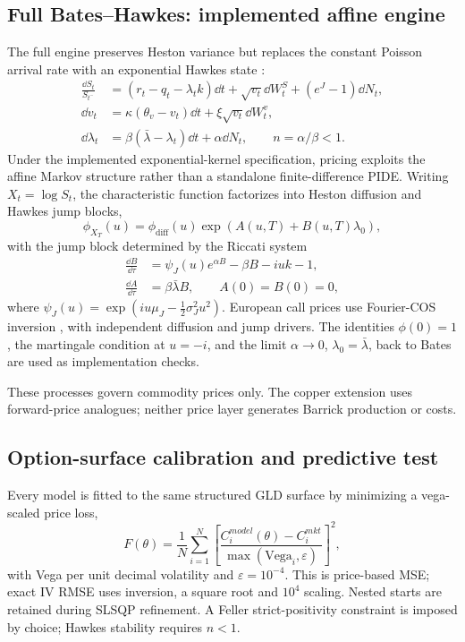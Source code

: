 \subsection{Full Bates--Hawkes: implemented affine engine}
The full engine preserves Heston variance but replaces the constant Poisson arrival rate with an exponential Hawkes state \citep{hawkes1971}:
\begin{align}
\frac{\dd S_t}{S_{t^-}}&=(r_t-q_t-\lambda_t k)\dd t+\sqrt{v_t}\dd W_t^S+(e^J-1)\dd N_t,\\
\dd v_t&=\kappa(\theta_v-v_t)\dd t+\xi\sqrt{v_t}\dd W_t^v,\\
\dd\lambda_t&=\beta(\bar\lambda-\lambda_t)\dd t+\alpha\dd N_t,
\qquad n=\alpha/\beta<1.
\label{eq:full_bh_sde}
\end{align}
Under the implemented exponential-kernel specification, pricing exploits the affine Markov structure rather than a standalone finite-difference PIDE. Writing $X_t=\log S_t$, the characteristic function factorizes into Heston diffusion and Hawkes jump blocks,
\begin{equation}
\phi_{X_T}(u)=\phi_{\mathrm{diff}}(u)\exp\!\left(A(u,T)+B(u,T)\lambda_0\right),
\label{eq:bh_cf}
\end{equation}
with the jump block determined by the Riccati system
\begin{align}
\frac{\dd B}{\dd\tau}&=\psi_J(u)e^{\alpha B}-\beta B-iuk-1,\\
\frac{\dd A}{\dd\tau}&=\beta\bar\lambda B,
\qquad A(0)=B(0)=0,
\label{eq:bh_riccati}
\end{align}
where $\psi_J(u)=\exp(iu\mu_J-\tfrac12\sigma_J^2u^2)$. European call prices use Fourier-COS inversion \citep{cos2008}, with independent diffusion and jump drivers. The identities $\phi(0)=1$, the martingale condition at $u=-i$, and the limit $\alpha\to0$, $\lambda_0=\bar\lambda$, back to Bates are used as implementation checks.

\begin{methodbox}
These processes govern commodity prices only. The copper extension uses forward-price analogues; neither price layer generates Barrick production or costs.
\end{methodbox}

\subsection{Option-surface calibration and predictive test}
Every model is fitted to the same structured GLD surface by minimizing a vega-scaled price loss,
\begin{equation}
F(\theta)=\frac{1}{N}\sum_{i=1}^{N}
\left[\frac{C_i^{model}(\theta)-C_i^{mkt}}
{\max(\mathrm{Vega}_i,\varepsilon)}\right]^2,
\label{eq:calibration_loss}
\end{equation}
with Vega per unit decimal volatility and $\varepsilon=10^{-4}$. This is price-based MSE; exact IV RMSE uses inversion, a square root and $10^4$ scaling. Nested starts are retained during SLSQP refinement. A Feller strict-positivity constraint is imposed by choice; Hawkes stability requires $n<1$.

